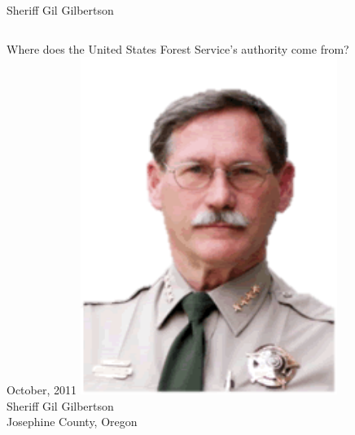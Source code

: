\documentclass{beamer}
\begin{document}
\begin{frame}{Sheriff Gil Gilbertson}
    \begin{columns}[onlytextwidth]
            \centering
            Where does the United States Forest Service's authority come from?
            \\ { \tiny October, 2011 }
            \centering
            \includegraphics[width=0.75\textwidth]{img/gil-gilbertson.png}
            \\ Sheriff Gil Gilbertson
            \\ Josephine County, Oregon
    \end{columns}
\end{frame}
\end{document}
